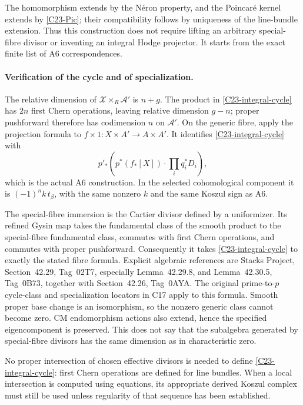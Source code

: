 \documentclass[11pt]{article}
\theoremstyle{definition}\newtheorem{definition}[theorem]{Definition}\newtheorem{remark}[theorem]{Remark}
\begin{document}
The homomorphism extends by the N\'eron property, and the
Poincar\'e kernel extends by \eqref{C23-Pic}; their compatibility
follows by uniqueness of the line-bundle extension.
Thus this construction does not require lifting an arbitrary
special-fibre divisor or inventing an integral Hodge projector.
It starts from the exact finite list of A6 correspondences.

\paragraph{Verification of the cycle and of specialization.}
The relative dimension of $\mathcal X\times_R\mathcal A'$
is $n+g$.  The product in \eqref{C23-integral-cycle} has
$2n$ first Chern operations, leaving relative dimension
$g-n$; proper pushforward therefore has codimension $n$
on $\mathcal A'$.
On the generic fibre, apply the projection formula to
$f\times1:X\times A'\to A\times A'$.
It identifies \eqref{C23-integral-cycle} with
\[
 p'_*(p^*(f_*[X])\cdot\prod_iq_i^*D_i),
\]
which is the actual A6 construction.  In the selected
cohomological component it is $(-1)^n k\,t_\beta$, with
the same nonzero $k$ and the same Koszul sign as A6.

The special-fibre immersion is the Cartier divisor defined
by a uniformizer.  Its refined Gysin map takes the fundamental
class of the smooth product to the special-fibre fundamental
class, commutes with first Chern operations, and commutes
with proper pushforward.  Consequently it takes
\eqref{C23-integral-cycle} to exactly the stated fibre formula.
Explicit algebraic references are Stacks Project,
Section~42.29, Tag~02T7, especially Lemma~42.29.8,
and Lemma~42.30.5, Tag~0B73, together with
Section~42.26, Tag~0AYA.  The original prime-to-$p$
cycle-class and specialization locators in C17 apply to this
formula.  Smooth proper base change is an isomorphism, so
the nonzero generic class cannot become zero.
CM endomorphism actions also extend, hence the specified
eigencomponent is preserved.  This does not say that the
subalgebra generated by special-fibre divisors has the same
dimension as in characteristic zero.

No proper intersection of chosen effective divisors is needed
to define \eqref{C23-integral-cycle}: first Chern operations
are defined for line bundles.  When a local intersection is
computed using equations, its appropriate derived Koszul
complex must still be used unless regularity of that sequence
has been established.
\end{document}
